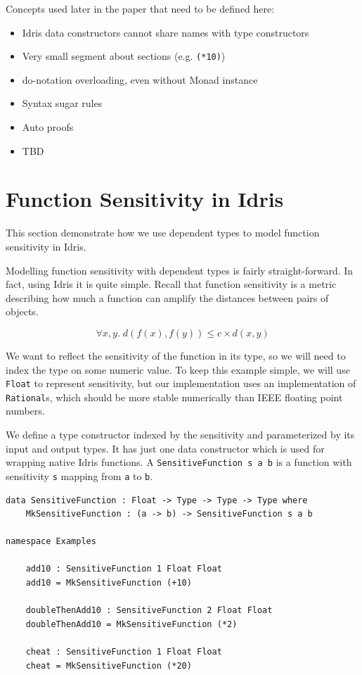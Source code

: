 \documentclass[12pt]{article}
\begin{document}
Concepts used later in the paper that need to be defined here:

\begin{itemize}
\item Idris data constructors cannot share names with type constructors
\item Very small segment about sections (e.g. \texttt{(*10)})
\item do-notation overloading, even without Monad instance
\item Syntax sugar rules
\item Auto proofs
\item TBD
\end{itemize}

\section{Function Sensitivity in Idris}\label{sec:function_sensitivity}

This section demonstrate how we use dependent types to model function sensitivity in Idris.

Modelling function sensitivity with dependent types is fairly straight-forward.
In fact, using Idris it is quite simple.
Recall that function sensitivity is a metric describing how much a function can amplify the distances between pairs of objects.

$$ \forall x,y.\; d(f(x),f(y)) \le c \times d(x,y) $$

We want to reflect the sensitivity of the function in its type, so we will need to index the type on some numeric value.
To keep this example simple, we will use \texttt{Float} to represent sensitivity, but our implementation uses an implementation of \texttt{Rational}s, which should be more stable numerically than IEEE floating point numbers.

We define a type constructor indexed by the sensitivity and parameterized by its input and output types.
It has just one data constructor which is used for wrapping native Idris functions.
A \texttt{SensitiveFunction s a b} is a function with sensitivity \texttt{s} mapping from \texttt{a} to \texttt{b}.

\begin{lstlisting}
data SensitiveFunction : Float -> Type -> Type -> Type where
    MkSensitiveFunction : (a -> b) -> SensitiveFunction s a b

namespace Examples

    add10 : SensitiveFunction 1 Float Float
    add10 = MkSensitiveFunction (+10)

    doubleThenAdd10 : SensitiveFunction 2 Float Float
    doubleThenAdd10 = MkSensitiveFunction (*2)

    cheat : SensitiveFunction 1 Float Float
    cheat = MkSensitiveFunction (*20)
\end{lstlisting}
\end{document}
